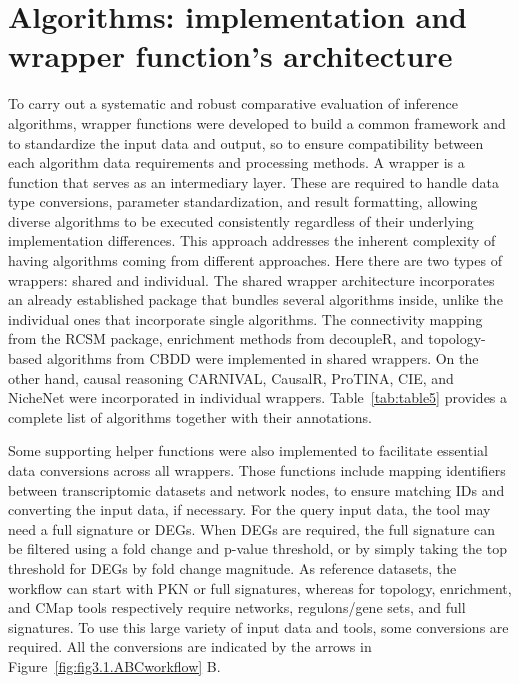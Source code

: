 \section{Algorithms: implementation and wrapper function's architecture} %
\label{sec:algorithms}

To carry out a systematic and robust comparative evaluation of inference algorithms, wrapper functions were developed to build a common framework and to standardize the input data and output, so to ensure compatibility between each algorithm data requirements and processing methods. 
A wrapper is a function that serves as an intermediary layer. 
These are required to handle data type conversions, parameter standardization, and result formatting, allowing diverse algorithms to be executed consistently regardless of their underlying implementation differences. This approach addresses the inherent complexity of having algorithms coming from different approaches. Here there are two types of wrappers: shared and individual. The shared wrapper architecture incorporates an already established package that bundles several algorithms inside, unlike the individual ones that incorporate single algorithms. The connectivity mapping from the \gls{RCSM} package, enrichment methods from decoupleR, and topology-based algorithms from \gls{CBDD} were implemented in shared wrappers. On the other hand, causal reasoning \gls{CARNIVAL}, CausalR, \gls{ProTINA}, \gls{CIE}, and NicheNet were incorporated in individual wrappers. Table~\ref{tab:table5} provides a complete list of algorithms together with their annotations.

Some supporting helper functions were also implemented to facilitate essential data conversions across all wrappers. Those functions include mapping identifiers between transcriptomic datasets and network nodes, to ensure matching IDs and converting the input data, if necessary. For the query input data, the tool may need a full signature or \gls{DEGs}. When \gls{DEGs} are required, the full signature can be filtered using a fold change and p-value threshold, or by simply taking the top threshold for \gls{DEGs} by fold change magnitude. As reference datasets, the workflow can start with PKN or full signatures, whereas for topology, enrichment, and \gls{CMap} tools respectively require networks, regulons/gene sets, and full signatures. To use this large variety of input data and tools, some conversions are required. All the conversions are indicated by the arrows in Figure~\ref{fig:fig3.1.ABCworkflow} B. 

